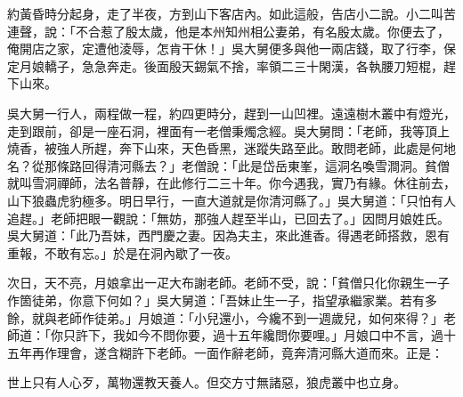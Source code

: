 約黃昏時分起身，走了半夜，方到山下客店內。{}如此這般，告店小二說。小二叫苦連聲，說：「不合惹了殷太歲，他是本州知州相公妻弟，有名殷太歲。你便去了，俺開店之家，定遭他淩辱，怎肯干休！」吳大舅便多與他一兩店錢，取了行李，保定月娘轎子，急急奔走。後面殷天錫氣不捨，率領二三十閑漢，各執腰刀短棍，趕下山來。

吳大舅一行人，兩程做一程，約四更時分，趕到一山凹裡。遠遠樹木叢中有燈光，走到跟前，卻是一座石洞，裡面有一老僧秉燭念經。吳大舅問：「老師，我等頂上燒香，被強人所趕，奔下山來，天色昏黑，迷蹤失路至此。敢問老師，此處是何地名？從那條路回得清河縣去？」老僧說：「此是岱岳東峯，這洞名喚雪澗洞。貧僧就叫雪洞禪師，法名普靜，在此修行二三十年。你今遇我，實乃有緣。休往前去，山下狼蟲虎豹極多。明日早行，一直大道就是你清河縣了。」吳大舅道：「只怕有人追趕。」老師把眼一觀說：「無妨，那強人趕至半山，已回去了。」因問月娘姓氏。吳大舅道：「此乃吾妹，西門慶之妻。因為夫主，來此進香。得遇老師搭救，恩有重報，不敢有忘。」於是在洞內歇了一夜。

次日，天不亮，月娘拿出一疋大布謝老師。老師不受，說：「貧僧只化你親生一子作箇徒弟，你意下何如？」{}吳大舅道：「吾妹止生一子，指望承繼家業。若有多餘，就與老師作徒弟。」月娘道：「小兒還小，今纔不到一週歲兒，如何來得？」老師道：「你只許下，我如今不問你要，過十五年纔問你要哩。」月娘口中不言，過十五年再作理會，遂含糊許下老師。一面作辭老師，竟奔清河縣大道而來。正是：

\begin{myquote}
世上只有人心歹，萬物還教天養人。但交方寸無諸惡，狼虎叢中也立身。
\end{myquote}


